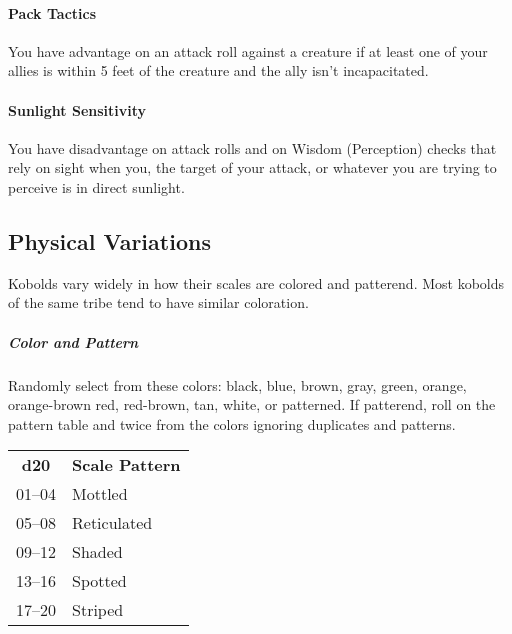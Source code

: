 \documentclass{dm}
\begin{document}
\begin{cols}
    \paragraph{Pack Tactics}
    You have advantage on an attack roll against a creature if at least one of your allies is within 5 feet of the creature and the ally isn't incapacitated.

    \paragraph{Sunlight Sensitivity}
    You have disadvantage on attack rolls and on Wisdom (Perception) checks that rely on sight when you, the target of your attack, or whatever you are trying to perceive is in direct sunlight.

    \subsection{Physical Variations}
    Kobolds vary widely in how their scales are colored and patterend.
    Most kobolds of the same tribe tend to have similar coloration.

    \subparagraph{Color and Pattern}
    Randomly select from these colors: black, blue, brown, gray, green, orange, orange-brown red, red-brown, tan, white, or patterned.
    If patterend, roll on the pattern table and twice from the colors ignoring duplicates and patterns.

    \begin{tabularz}
      \begin{tabularx}{\linewidth}{cX}
        \textbf{d20}  & \textbf{Scale Pattern} \\
        01--04 & Mottled\\
        05--08 & Reticulated \\
        09--12 & Shaded \\
        13--16 & Spotted \\
        17--20 & Striped \\
      \end{tabularx}
    \end{tabularz}
  \end{cols}
\end{document}
